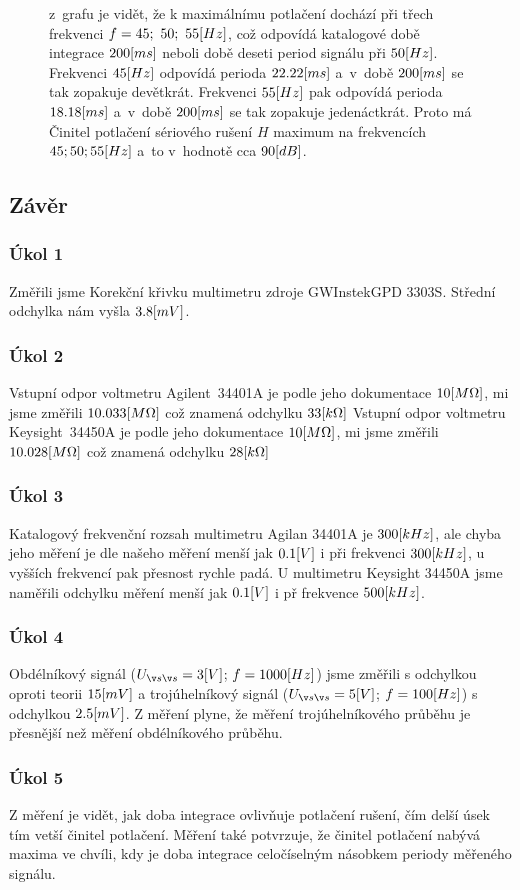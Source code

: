 \documentclass{article}
\begin{document}
\begin{figure}[H]
\begin{minipage}[t]{0.2\textwidth}
        \vspace{-108mm}
        z~grafu je vidět, že k maximálnímu potlačení dochází při třech frekvenci \(f = 45;~50;~55\-[Hz]\), což odpovídá katalogové době integrace \(200\-[ms]\) neboli době deseti period signálu při \(50\-[Hz]\).
        Frekvenci \(45\-[Hz]\) odpovídá perioda \(22.22\-[ms]\) a~v~době \(200\-[ms]\) se tak zopakuje devětkrát.
        Frekvenci \(55\-[Hz]\) pak odpovídá perioda \(18.18\-[ms]\) a~v~době \(200\-[ms]\) se tak zopakuje jedenáctkrát.
        Proto má Činitel potlačení sériového rušení \(H\) maximum na frekvencích \\\(45;\-50;\-55\-[Hz]\) a~to v~hodnotě cca \(90\-[dB]\).
    \end{minipage}
\end{figure}

\newpage
\subsection{Závěr}

\subsubsection{Úkol 1}
Změřili jsme Korekční křivku multimetru zdroje GWInstekGPD 3303S.
Střední odchylka nám vyšla \(3.8\-[mV]\).

\subsubsection{Úkol 2}
Vstupní odpor voltmetru Agilent~34401A  je podle jeho dokumentace \(10\-[M\Omega]\), mi jsme změřili \(10.033\-[M\Omega]\) což znamená odchylku \(33\-[k\Omega]\)
Vstupní odpor voltmetru Keysight~34450A je podle jeho dokumentace \(10\-[M\Omega]\), mi jsme změřili \(10.028\-[M\Omega]\) což znamená odchylku \(28\-[k\Omega]\)

\subsubsection{Úkol 3}
Katalogový frekvenční rozsah multimetru Agilan 34401A je \(300\-[kHz]\), ale chyba jeho měření je dle našeho měření menší jak \(0.1\-[V]\) i při frekvenci \(300\-[kHz]\), u vyšších frekvencí pak přesnost rychle padá.
U multimetru Keysight 34450A jsme naměřili odchylku měření menší jak \(0.1\-[V]\) i př frekvence \(500\-[kHz]\).

\subsubsection{Úkol 4}
Obdélníkový signál (\(U_{šš} = 3\-[V]\); \(f = 1000\-[Hz]\)) jsme změřili s odchylkou oproti teorii \(15\-[mV]\) a trojúhelníkový signál (\(U_{šš} = 5\-[V]\); \(f = 100\-[Hz]\)) s odchylkou \(2.5\-[mV]\).
Z měření plyne, že měření trojúhelníkového průběhu je přesnější než měření obdélníkového průběhu.

\subsubsection{Úkol 5}
Z měření je vidět, jak doba integrace ovlivňuje potlačení rušení, čím delší úsek tím vetší činitel potlačení.
Měření také potvrzuje, že činitel potlačení nabývá maxima ve chvíli, kdy je doba integrace celočíselným násobkem periody měřeného signálu.
\end{document}
